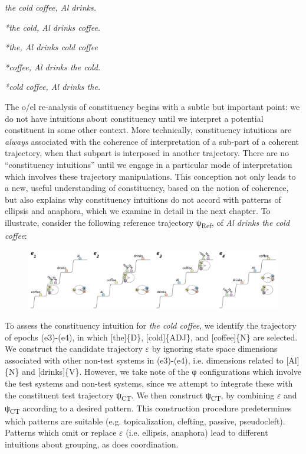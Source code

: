 \textit{the cold coffee, Al drinks.}

\textit{*the cold, Al drinks coffee.}

\textit{*the, Al drinks cold coffee}

\textit{*coffee, Al drinks the cold.}

\textit{*cold coffee, Al drinks the.}

  The o/el re-analysis of constituency begins with a subtle but important point: we do not have intuitions about constituency until we interpret a potential constituent in some other context. More technically, constituency intuitions are \textit{always} associated with the coherence of interpretation of a sub-part of a coherent trajectory, when that subpart is interposed in another trajectory. There are no “constituency intuitions” until we engage in a particular mode of interpretation which involves these trajectory manipulations. This conception not only leads to a new, useful understanding of constituency, based on the notion of coherence, but also explains why constituency intuitions do not accord with patterns of ellipsis and anaphora, which we examine in detail in the next chapter. To illustrate, consider the following reference trajectory ψ\textsubscript{Ref}, of \textit{Al drinks the cold coffee}:

  
\begin{figure}
\includegraphics[width=\textwidth]{figures/Tilsen-img137.png}
\caption{\missingcaption}
\label{fig:}
\end{figure}
  

  To assess the constituency intuition for \textit{the cold coffee}, we identify the trajectory of epochs (e3)-(e4), in which [the]\{D\}, [cold]\{ADJ\}, and [coffee]\{N\} are selected. We construct the candidate trajectory $\varepsilon $ by ignoring state space dimensions associated with other non-test systems in (e3)-(e4), i.e. dimensions related to [Al]\{N\} and [drinks]\{V\}. However, we take note of the φ configurations which involve the test systems and non-test systems, since we attempt to integrate these with the constituent test trajectory ψ\textsubscript{CT}. We then construct ψ\textsubscript{CT}, by combining $\varepsilon $ and ψ\textsubscript{CT} according to a desired pattern. This construction procedure predetermines which patterns are suitable (e.g. topicalization, clefting, passive, pseudocleft). Patterns which omit or replace $\varepsilon $ (i.e. ellipsis, anaphora) lead to different intuitions about grouping, as does coordination.

